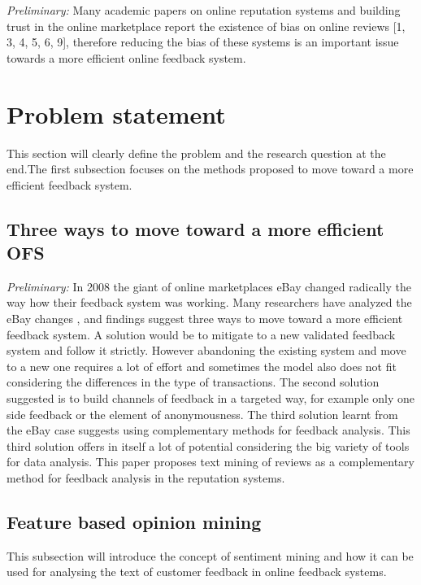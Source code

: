 \textit{Preliminary:} Many academic papers on online reputation systems and building trust in the online marketplace report the existence of bias on online reviews [1, 3, 4, 5, 6, 9], therefore reducing the bias of these systems is an important issue towards a more efficient online feedback system. 

\section{Problem statement}
\label{sec:problemstatement}
This section will clearly define the problem and the research question at the end.The first subsection focuses on the methods proposed to move toward a more efficient feedback system.

\subsection{Three ways to move toward a more efficient OFS}
\textit{Preliminary:} In 2008 the giant of online marketplaces eBay changed radically the way how their feedback system was working. Many researchers have analyzed the eBay changes \cite{fradkin2016bias,resnick2006value,bolton2013engineering,dini2009buying,dellarocas2008sound}, and findings suggest three ways to move toward a more efficient feedback system. A solution would be to mitigate to a new validated feedback system and follow it strictly. However abandoning the existing system and move to a new one requires a lot of effort and sometimes the model also does not fit considering the differences in the type of transactions. The second solution suggested is to build channels of feedback in a targeted way, for example only one side feedback or the element of anonymousness. The third solution learnt from the eBay case suggests using complementary methods for feedback analysis. This third solution offers in itself a lot of potential considering the big variety of tools for data analysis. This paper proposes text mining of reviews as a complementary method for feedback analysis in the reputation systems. 

\subsection{Feature based opinion mining}
This subsection will introduce the concept of sentiment mining and how it can be used for analysing the text of customer feedback in online feedback systems.

